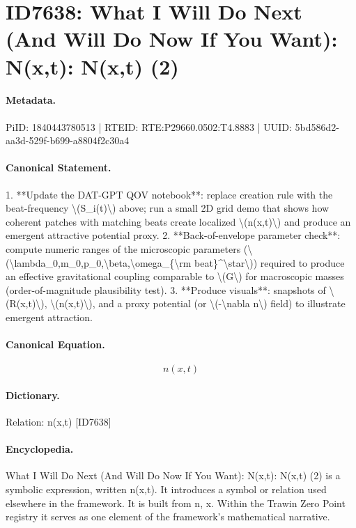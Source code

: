 \section*{ID7638: What I Will Do Next (And Will Do Now If You Want): N(x,t): N(x,t) (2)}
\paragraph{Metadata.}
PiID: 1840443780513 | RTEID: RTE:P29660.0502:T4.8883 | UUID: 5bd586d2-aa3d-529f-b699-a8804f2c30a4

\paragraph{Canonical Statement.}
1. **Update the DAT-GPT QOV notebook**: replace creation rule with the beat-frequency \textbackslash{}(S\_i(t)\textbackslash{}) above; run a small 2D grid demo that shows how coherent patches with matching beats create localized \textbackslash{}(n(x,t)\textbackslash{}) and produce an emergent attractive potential proxy. 2. **Back-of-envelope parameter check**: compute numeric ranges of the microscopic parameters (\textbackslash{}(\textbackslash{}lambda\_0,m\_0,p\_0,\textbackslash{}beta,\textbackslash{}omega\_\{\textbackslash{}rm beat\}\textasciicircum{}\textbackslash{}star\textbackslash{})) required to produce an effective gravitational coupling comparable to \textbackslash{}(G\textbackslash{}) for macroscopic masses (order-of-magnitude plausibility test). 3. **Produce visuals**: snapshots of \textbackslash{}(R(x,t)\textbackslash{}), \textbackslash{}(n(x,t)\textbackslash{}), and a proxy potential (or \textbackslash{}(-\textbackslash{}nabla n\textbackslash{}) field) to illustrate emergent attraction.

\paragraph{Canonical Equation.}
\[
n(x,t)
\]

\paragraph{Dictionary.}
Relation: n(x,t) [ID7638]

\paragraph{Encyclopedia.}
What I Will Do Next (And Will Do Now If You Want): N(x,t): N(x,t) (2) is a symbolic expression, written n(x,t). It introduces a symbol or relation used elsewhere in the framework. It is built from n, x. Within the Trawin Zero Point registry it serves as one element of the framework's mathematical narrative.
